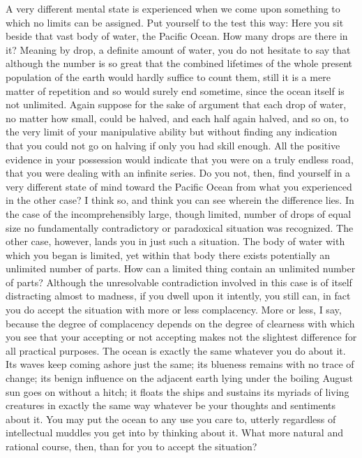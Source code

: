 \documentclass[a4paper, 11pt, oneside, polutonikogreek, english]{article}
\begin{document}
A very different mental state is experienced when we come upon something to which no limits can be assigned. Put yourself to the test this way: Here you sit beside that vast body of water, the Pacific Ocean. How many drops are there in it? Meaning by drop, a definite amount of water, you do not hesitate to say that although the number is so great that the combined lifetimes of the whole present population of the earth would hardly suffice to count them, still it is a mere matter of repetition and so would surely end sometime, since the ocean itself is not unlimited. Again suppose for the sake of argument that each drop of water, no matter how small, could be halved, and each half again halved, and so on, to the very limit of your manipulative ability but without finding any indication that you could not go on halving if only you had skill enough. All the positive evidence in your possession would indicate that you were on a truly endless road, that you were dealing with an infinite series. Do you not, then, find yourself in a very different state of mind toward the Pacific Ocean from what you experienced in the other case? I think so, and think you can see wherein the difference lies. In the case of the incomprehensibly large, though limited, number of drops of equal size no fundamentally contradictory or paradoxical situation was recognized. The other case, however, lands you in just such a situation. The body of water with which you began is limited, yet within that body there exists potentially an unlimited number of parts. How can a limited thing contain an unlimited number of parts? Although the unresolvable contradiction involved in this case is of itself distracting almost to madness, if you dwell upon it intently, you still can, in fact you do accept the situation with more or less complacency. More or less, I say, because the degree of complacency depends on the degree of clearness with which you see that your accepting or not accepting makes not the slightest difference for all practical purposes. The ocean is exactly the same whatever you do about it. Its waves keep coming ashore just the same; its blueness remains with no trace of change; its benign influence on the adjacent earth lying under the boiling August sun goes on without a hitch; it floats the ships and sustains its myriads of living creatures in exactly the same way whatever be your thoughts and sentiments about it. You may put the ocean to any use you care to, utterly regardless of intellectual muddles you get into by thinking about it. What more natural and rational course, then, than for you to accept the situation?
\end{document}
